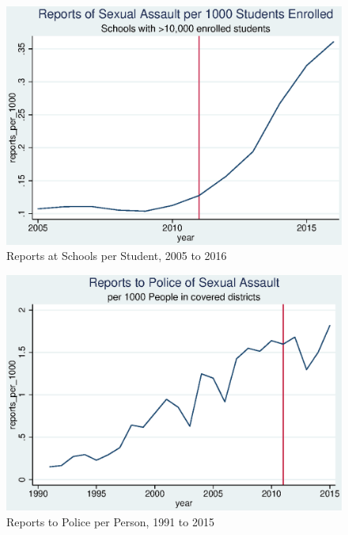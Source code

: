\documentclass[AER]{AEA}
\begin{document}



\clearpage
\appendix


\begin{figure}

\includegraphics[]{figures/school_reports.eps}

\caption{Reports at Schools per Student, 2005 to 2016}
\end{figure}

\begin{figure}

\includegraphics[]{figures/police_yearly_reports.eps}

\caption{Reports to Police per Person, 1991 to 2015}
\end{figure}
\end{document}

